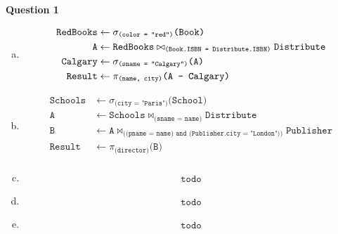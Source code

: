 \documentclass[11pt]{article}
\def\code#1{\texttt{#1}}
\def\select#1#2{\sigma_{\code{#1}} \code{(#2)}}
\def\join#1#2#3{\code{#1} \bowtie_{\code{#2}} \code{#3}}
\def\proj#1#2{\pi_{\code{#1}} \code{(#2)}}
\def\diff#1#2{\code{#1} - \code{#2}}
\begin{document}
\item[] \textbf{Question 1}

  \begin{enumerate}[a.]
    \item
      \begin{equation*}
      \begin{aligned}
        \code{RedBooks} &\leftarrow \select{(color = "red")}{Book} \\
        \code{A} &\leftarrow \join{RedBooks}{(Book.ISBN = Distribute.ISBN)}{Distribute} \\
        \code{Calgary} &\leftarrow \select{(sname = "Calgary")}{A} \\
        \code{Result} &\leftarrow \proj{(name, city)} {\diff{A}{Calgary}}
      \end{aligned}
      \end{equation*}

    \item
      \begin{equation*}
      \begin{aligned}
        \code{Schools} &\leftarrow \select{(city = "Paris")}{School} \\
        \code{A} &\leftarrow \join{Schools}{(sname = name)}{Distribute} \\
        \code{B} &\leftarrow \join{A}{((pname = name) and (Publisher.city = "London"))}{Publisher} \\
        \code{Result} &\leftarrow \proj{(director)}{B} \\
      \end{aligned}
      \end{equation*}

    \item 
      \begin{equation*}
      \begin{aligned}
				\code{todo}
      \end{aligned}
      \end{equation*}

    \item
      \begin{equation*}
      \begin{aligned}
				\code{todo}
      \end{aligned}
      \end{equation*}

    \item
      \begin{equation*}
      \begin{aligned}
				\code{todo}
      \end{aligned}
      \end{equation*}
  \end{enumerate}
\end{document}
